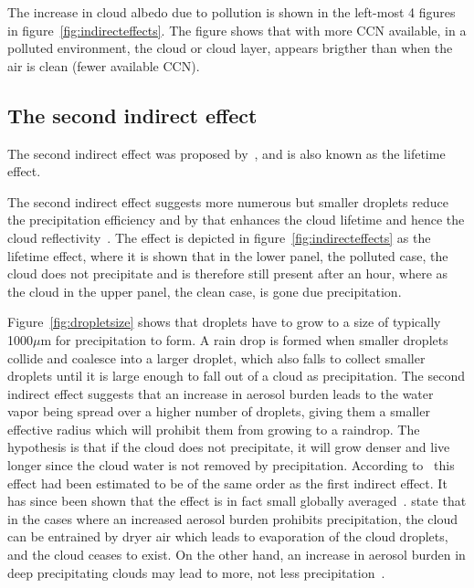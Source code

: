 The increase in cloud albedo due to pollution is shown in the left-most 4 figures in figure~\ref{fig:indirecteffects}. The figure shows that with more CCN available, in a polluted environment, the cloud or cloud layer, appears brigther than when the air is clean (fewer available CCN).

\subsection{The second indirect effect}
The second indirect effect was proposed by~\citet{Albrecht1989}, and is also known as the lifetime effect.

The second indirect effect suggests more numerous but smaller droplets reduce the precipitation efficiency and by that enhances the cloud lifetime and hence the cloud reflectivity~\citep{Albrecht1989}. The effect is depicted in figure~\ref{fig:indirecteffects} as the lifetime effect, where it is shown that in the lower panel, the polluted case, the cloud does not precipitate and is therefore still present after an hour, where as the cloud in the upper panel, the clean case, is gone due precipitation.

Figure~\ref{fig:dropletsize} shows that droplets have to grow to a size of typically 1000$\mu\text{m}$ for precipitation to form. A rain drop is formed when smaller droplets collide and coalesce into a larger droplet, which also falls to collect smaller droplets until it is large enough to fall out of a cloud as precipitation. The second indirect effect suggests that an increase in aerosol burden leads to the water vapor being spread over a higher number of droplets, giving them a smaller effective radius which will prohibit them from growing to a raindrop. The hypothesis is that if the cloud does not precipitate, it will grow denser and live longer since the cloud water is not removed by precipitation. According to~\citet{Lohmann2005} this effect had been estimated to be of the same order as the first indirect effect. It has since been shown that the effect is in fact small globally averaged~\citep{Stevens2009}. \citet{Stevens2009} state that in the cases where an increased aerosol burden prohibits precipitation, the cloud can be entrained by dryer air which leads to evaporation of the cloud droplets, and the cloud ceases to exist. On the other hand, an increase in aerosol burden in deep precipitating clouds may lead to more, not less precipitation~\citep{Stevens2008}.


